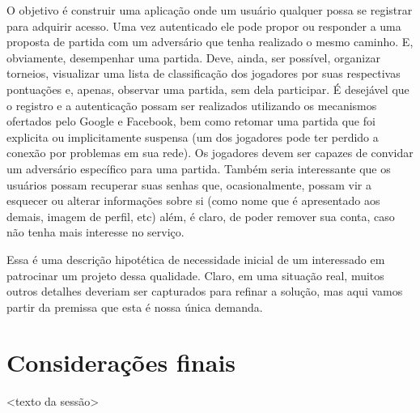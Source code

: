       O objetivo é construir uma aplicação onde um usuário qualquer possa se
      registrar para adquirir acesso. Uma vez autenticado ele pode propor ou
      responder a uma proposta de partida com um adversário que tenha realizado
      o mesmo caminho. E, obviamente, desempenhar uma partida. Deve, ainda, ser
      possível, organizar torneios, visualizar uma lista de classificação dos
      jogadores por suas respectivas pontuações e, apenas, observar uma partida,
      sem dela participar. É desejável que o registro e a autenticação possam
      ser realizados utilizando os mecanismos ofertados pelo Google e Facebook,
      bem como retomar uma partida que foi explicita ou implicitamente suspensa
      (um dos jogadores pode ter perdido a conexão por problemas em sua rede).
      Os jogadores devem ser capazes de convidar um adversário específico para
      uma partida. Também seria interessante que os usuários possam recuperar
      suas senhas que, ocasionalmente, possam vir a esquecer ou alterar
      informações sobre si (como nome que é apresentado aos demais, imagem de
      perfil, etc) além, é claro, de poder remover sua conta, caso não tenha
      mais interesse no serviço.

      Essa é uma descrição hipotética de necessidade inicial de um interessado
      em patrocinar um projeto dessa qualidade. Claro, em uma situação real,
      muitos outros detalhes deveriam ser capturados para refinar a solução, mas
      aqui vamos partir da premissa que esta é nossa única demanda.




    


  \section{Considerações finais}

    <texto da sessão>


  \clearpage

  \renewcommand\refname{Referências}

    
    


